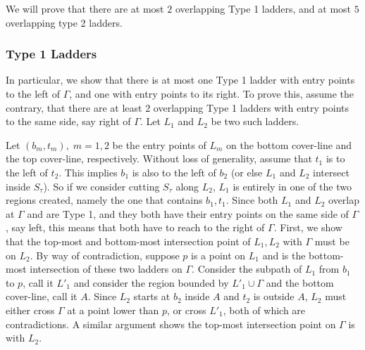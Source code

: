 \documentclass[10pt,a4paper]{amsart}
\theoremstyle{thmstyleone}
\begin{document}
    We will prove that there are at most $2$ overlapping Type 1 ladders, and at most $5$ overlapping type 2 ladders.

    \subsubsection*{Type 1 Ladders}
    In particular, we show that there is at most one Type 1 ladder with entry points to the left of $\Gamma$, and one with entry points to its right.
    To prove this, assume the contrary, that there are at least $2$ overlapping 
    Type 1 ladders with entry points to the same side, say right of $\Gamma$. Let $L_1$ and $L_2$ be two such ladders. 
   
    Let $(b_m, t_m),\; m = 1,2$ be the entry points of $L_m$ on the bottom cover-line and the top cover-line, respectively. Without loss of generality, assume that $t_1$ is to the left of $t_2$. 
   This implies $b_1$ is also to the left of $b_2$ (or else $L_1$ and $L_2$ intersect inside $S_\tau$). So if we consider cutting $S_\tau$ along $L_2$, $L_1$ is entirely in one of the two regions created, namely the one that contains $b_1,t_1$.     
    Since both $L_1$ and $L_2$ overlap at $\Gamma$ and are Type 1, and they both have their entry points on the same side of $\Gamma$, say  left, this means that both have to reach to the right of $\Gamma$. 
    First, we show that the top-most and bottom-most intersection point of $L_1,L_2$ with $\Gamma$ must be on $L_2$. By way of contradiction, suppose $p$ is a point on $L_1$ and is the bottom-most intersection of these two ladders on $\Gamma$. Consider the subpath of $L_1$ from $b_1$ to $p$, call it $L'_1$ and consider the region bounded by $L'_1\cup\Gamma$ and the bottom cover-line, call it $A$. Since $L_2$ starts at $b_2$ inside $A$ and $t_2$ is outside $A$, $L_2$ must either cross $\Gamma$ at a point lower than $p$, or cross $L'_1$, both of which are contradictions. A similar argument shows the top-most intersection point on $\Gamma$ is with $L_2$.
    
\end{document}
